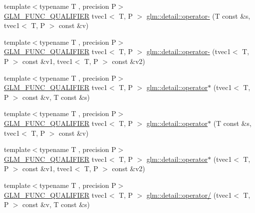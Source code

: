 \begin{DoxyCompactItemize}
\item 
{\footnotesize template$<$typename T , precision P$>$ }\\\hyperlink{setup_8hpp_a33fdea6f91c5f834105f7415e2a64407}{G\+L\+M\+\_\+\+F\+U\+N\+C\+\_\+\+Q\+U\+A\+L\+I\+F\+I\+ER} tvec1$<$ T, P $>$ \hyperlink{namespaceglm_1_1detail_a0ab8a1bcdd611cc64bbafcd90a0cac0e}{glm\+::detail\+::operator-\/} (T const \&s, tvec1$<$ T, P $>$ const \&v)
\item 
{\footnotesize template$<$typename T , precision P$>$ }\\\hyperlink{setup_8hpp_a33fdea6f91c5f834105f7415e2a64407}{G\+L\+M\+\_\+\+F\+U\+N\+C\+\_\+\+Q\+U\+A\+L\+I\+F\+I\+ER} tvec1$<$ T, P $>$ \hyperlink{namespaceglm_1_1detail_aefe88467c1bd07a213df0c2c735c4b2b}{glm\+::detail\+::operator-\/} (tvec1$<$ T, P $>$ const \&v1, tvec1$<$ T, P $>$ const \&v2)
\item 
{\footnotesize template$<$typename T , precision P$>$ }\\\hyperlink{setup_8hpp_a33fdea6f91c5f834105f7415e2a64407}{G\+L\+M\+\_\+\+F\+U\+N\+C\+\_\+\+Q\+U\+A\+L\+I\+F\+I\+ER} tvec1$<$ T, P $>$ \hyperlink{namespaceglm_1_1detail_abb3ead672e978cdd29e470f6f0fffe1f}{glm\+::detail\+::operator$\ast$} (tvec1$<$ T, P $>$ const \&v, T const \&s)
\item 
{\footnotesize template$<$typename T , precision P$>$ }\\\hyperlink{setup_8hpp_a33fdea6f91c5f834105f7415e2a64407}{G\+L\+M\+\_\+\+F\+U\+N\+C\+\_\+\+Q\+U\+A\+L\+I\+F\+I\+ER} tvec1$<$ T, P $>$ \hyperlink{namespaceglm_1_1detail_aaf681142f6dd505add3974f07756298e}{glm\+::detail\+::operator$\ast$} (T const \&s, tvec1$<$ T, P $>$ const \&v)
\item 
{\footnotesize template$<$typename T , precision P$>$ }\\\hyperlink{setup_8hpp_a33fdea6f91c5f834105f7415e2a64407}{G\+L\+M\+\_\+\+F\+U\+N\+C\+\_\+\+Q\+U\+A\+L\+I\+F\+I\+ER} tvec1$<$ T, P $>$ \hyperlink{namespaceglm_1_1detail_a9f5672d5724c30642d35a3193085eb3f}{glm\+::detail\+::operator$\ast$} (tvec1$<$ T, P $>$ const \&v1, tvec1$<$ T, P $>$ const \&v2)
\item 
{\footnotesize template$<$typename T , precision P$>$ }\\\hyperlink{setup_8hpp_a33fdea6f91c5f834105f7415e2a64407}{G\+L\+M\+\_\+\+F\+U\+N\+C\+\_\+\+Q\+U\+A\+L\+I\+F\+I\+ER} tvec1$<$ T, P $>$ \hyperlink{namespaceglm_1_1detail_a892d798ab34788b02b80522816f2e037}{glm\+::detail\+::operator/} (tvec1$<$ T, P $>$ const \&v, T const \&s)
\item 

\end{DoxyCompactItemize}
